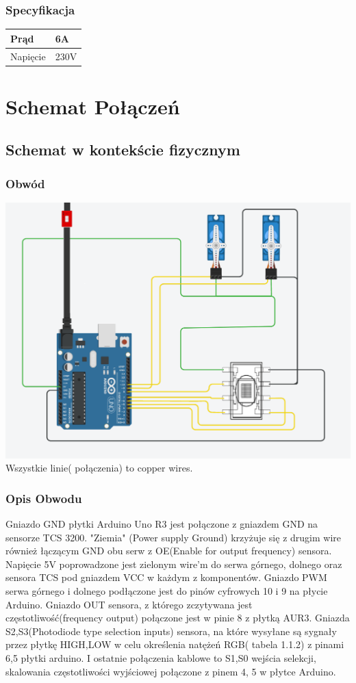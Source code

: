 \documentclass[12pt]{article}
\begin{document}
\subsubsection{Specyfikacja}
\begin{center}
\begin{tabular}{ | m{5cm} | m{3cm} | } 
\hline
Prąd& 6A \\
\hline
Napięcie& 230V\\
\hline
\end{tabular}
\end{center}
\section{Schemat Połączeń}
\subsection{Schemat w kontekście fizycznym}
\subsubsection{Obwód}
\hspace{-2.75cm}%
    \includegraphics[scale=0.5]{circuit_better.png}
Wszystkie linie( połączenia) to copper wires. 
\newpage
\subsubsection{Opis Obwodu}
Gniazdo GND płytki Arduino Uno R3 jest połączone z gniazdem GND na sensorze TCS 3200. "Ziemia" (Power supply Ground) krzyżuje się z drugim wire również łączącym GND obu serw z OE(Enable for output frequency) sensora. Napięcie 5V poprowadzone jest zielonym wire'm do serwa górnego, dolnego oraz sensora TCS pod gniazdem VCC w każdym z komponentów. Gniazdo PWM  serwa górnego i dolnego podłączone jest do pinów cyfrowych 10 i 9 na płycie Arduino. Gniazdo OUT sensora, z którego zczytywana jest częstotliwość(frequency output) połączone jest w pinie 8 z płytką AUR3. Gniazda S2,S3(Photodiode type selection inputs) sensora, na które wysyłane są sygnały przez płytkę HIGH,LOW w celu określenia natężeń RGB( tabela 1.1.2) z pinami 6,5 płytki arduino. I ostatnie połączenia kablowe to S1,S0 wejścia selekcji, skalowania częstotliwości wyjściowej połączone z pinem 4, 5 w płytce Arduino.
\end{document}
